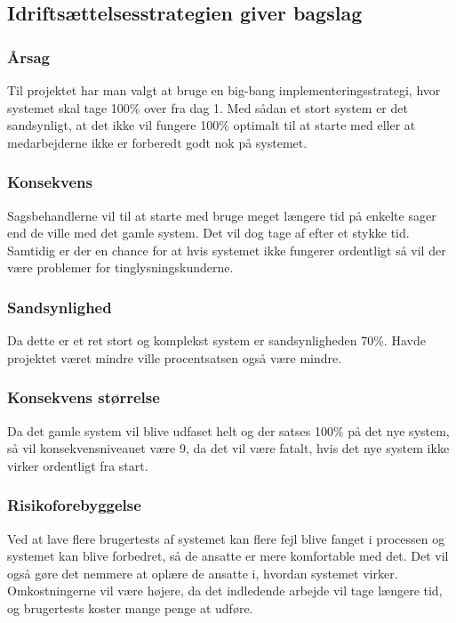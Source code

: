 \documentclass[10pt,a4paper,danish]{article}
\begin{document}






\subsection{Idriftsættelsesstrategien giver bagslag}
\subsubsection{Årsag}
Til projektet har man valgt at bruge en big-bang implementeringsstrategi, hvor systemet skal tage 100\% over fra dag 1.
Med sådan et stort system er det sandsynligt, at det ikke vil fungere 100\% optimalt til at starte med eller at medarbejderne ikke er forberedt godt nok på systemet. 

\subsubsection{Konsekvens}
Sagsbehandlerne vil til at starte med bruge meget længere tid på enkelte sager end de ville med det gamle system. Det vil dog tage af efter et stykke tid. Samtidig er der en chance for at hvis systemet ikke fungerer ordentligt så vil der være problemer for tinglysningskunderne.

\subsubsection{Sandsynlighed}
Da dette er et ret stort og komplekst system er sandsynligheden 70\%. Havde projektet været mindre ville procentsatsen også være mindre.

\subsubsection{Konsekvens størrelse}
Da det gamle system vil blive udfaset helt og der satses 100\% på det nye system, så vil konsekvensniveauet være 9, da det vil være fatalt, hvis det nye system ikke virker ordentligt fra start.

\subsubsection{Risikoforebyggelse}
Ved at lave flere brugertests af systemet kan flere fejl blive fanget i processen og systemet kan blive forbedret, så de ansatte er mere komfortable med det. Det vil også gøre det nemmere at oplære de ansatte i, hvordan systemet virker. Omkostningerne vil være højere, da det indledende arbejde vil tage længere tid, og brugertests koster mange penge at udføre.
\end{document}
